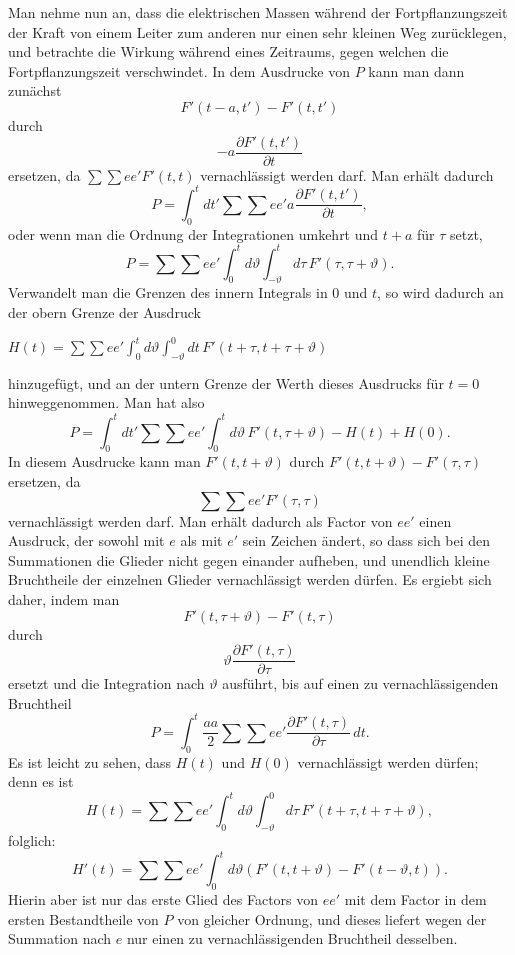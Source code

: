\documentclass[12pt,a4paper]{article}
\begin{document}
Man nehme nun an, dass die elektrischen Massen w\"ahrend der Fortpflanzungszeit der Kraft von einem Leiter zum anderen nur einen sehr kleinen Weg zur\"ucklegen, und betrachte die Wirkung w\"ahrend eines Zeitraums, gegen welchen die Fortpflanzungszeit verschwindet. In dem Ausdrucke von $P$ kann man dann zun\"achst
\[F'(t-a, t') - F'(t, t')\]
durch
\[-a \frac{\partial F'(t,t')}{\partial t}\]
ersetzen, da $\sum\sum ee' F'(t,t)$ vernachl\"assigt werden darf. Man erh\"alt dadurch
\[P = \int_{0}^{t} dt' \sum\sum ee' a \frac{\partial F'(t,t')}{\partial t},\]
oder wenn man die Ordnung der Integrationen umkehrt und $t+a$ f\"ur $\tau$ setzt,
\[P = \sum\sum ee' \int_{0}^{t} d\vartheta \int_{-\vartheta}^{t} d\tau\, F'(\tau, \tau+\vartheta).\]
Verwandelt man die Grenzen des innern Integrals in $0$ und $t$, so wird dadurch an der obern Grenze der Ausdruck

\newpage
\noindent $H(t) = \sum\sum ee' \int_{0}^{t} d\vartheta \int_{-\vartheta}^{0} dt\, F'(t+\tau, t+\tau+\vartheta)$

\medskip
\noindent hinzugef\"ugt, und an der untern Grenze der Werth dieses Ausdrucks f\"ur $t=0$ hinweggenommen. Man hat also
\[P = \int_{0}^{t} dt' \sum\sum ee' \int_{0}^{t} d\vartheta\, F'(t, \tau+\vartheta) - H(t) + H(0).\]
In diesem Ausdrucke kann man $F'(t, t+\vartheta)$ durch $F'(t, t+\vartheta) - F'(\tau, \tau)$ ersetzen, da
\[\sum\sum ee' F'(\tau, \tau)\]
vernachl\"assigt werden darf. Man erh\"alt dadurch als Factor von $ee'$ einen Ausdruck, der sowohl mit $e$ als mit $e'$ sein Zeichen \"andert, so dass sich bei den Summationen die Glieder nicht gegen einander aufheben, und unendlich kleine Bruchtheile der einzelnen Glieder vernachl\"assigt werden d\"urfen. Es ergiebt sich daher, indem man
\[F'(t, \tau+\vartheta) - F'(t, \tau)\]
durch
\[\vartheta \frac{\partial F'(t,\tau)}{\partial \tau}\]
ersetzt und die Integration nach $\vartheta$ ausf\"uhrt, bis auf einen zu vernachl\"assigenden Bruchtheil
\[P = \int_{0}^{t} \frac{aa}{2} \sum\sum ee' \frac{\partial F'(t,\tau)}{\partial \tau}\, dt.\]
Es ist leicht zu sehen, dass $H(t)$ und $H(0)$ vernachl\"assigt werden d\"urfen; denn es ist
\[H(t) = \sum\sum ee' \int_{0}^{t} d\vartheta \int_{-\vartheta}^{0} d\tau\, F'(t+\tau, t+\tau+\vartheta),\]
folglich:
\[H'(t) = \sum\sum ee' \int_{0}^{t} d\vartheta \left(F'(t,t+\vartheta) - F'(t-\vartheta, t)\right).\]
Hierin aber ist nur das erste Glied des Factors von $ee'$ mit dem Factor in dem ersten Bestandtheile von $P$ von gleicher Ordnung, und dieses liefert wegen der Summation nach $e$ nur einen zu vernachl\"assigenden Bruchtheil desselben.
\end{document}
